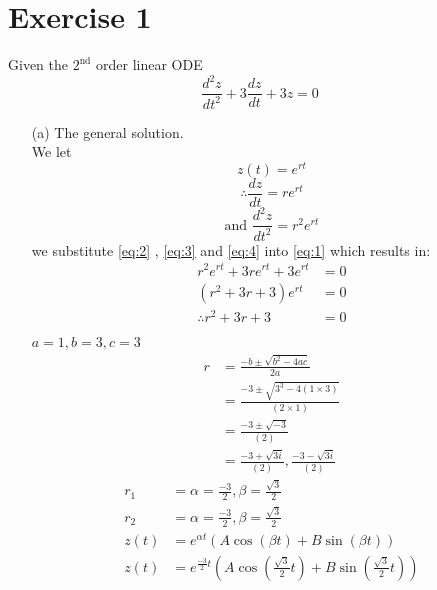 \documentclass[12pt,a4paper]{article}
\begin{document}
\section*{Exercise 1}
Given the $2^{\text{nd}}$ order linear ODE
\begin{equation}
		\frac{d^2z}{dt^2}   + 3 \frac{dz}{dt} + 3z  = 0
		\label{eq:1}
\end{equation}
\begin{enumerate}
			\item[(a)] The general solution.\\
				We let 
					\begin{equation}
							z(t) =  e^{rt} 
							\label{eq:2}
					\end{equation}
					\begin{equation}
							\therefore \frac{dz}{dt}  =  re^{rt} 
							\label{eq:3}
					\end{equation}
					\begin{equation}
						\text{and } 	\frac{d^2z}{dt^2} =  r^2 e^{rt}
						\label{eq:4}
					\end{equation}
				we substitute \eqref{eq:2} ,  \eqref{eq:3} and \eqref{eq:4}  into \eqref{eq:1} which results in:
						\begin{align*}
								r^2e^{rt} + 3re^{rt} + 3e^{rt} &= 0\\
								(r^2 + 3r + 3)e^{rt} &= 0\\
								\therefore r^2 + 3r + 3 &=  0\\
						\end{align*}
						$a  = 1,  b  =  3, c =  3$
						\begin{align*}
								r &=  \frac{  -b \pm \sqrt{ b^2 - 4ac}  }{ 2a}\\
								&= \frac{-3  \pm  \sqrt{3^3 -  4(1\times 3)  } }{(2 \times 1)}\\
								&= \frac{ -3 \pm \sqrt{ -3} }{ (2)}\\
								&=   \frac{ -3 +  \sqrt{ 3i} }{ (2)} ,  \frac{ -3  - \sqrt{ 3i} }{ (2)}
						\end{align*}
						\begin{align*}
								r_1 &=  \alpha = \frac{-3}{2},  \beta =  \frac{\sqrt{3}}{2}\\
								r_2 &=  \alpha = \frac{-3}{2},  \beta =  \frac{\sqrt{3}}{2}\\
							z(t) &= e^{\alpha t}  \left(   A\cos(\beta t)  + B \sin(\beta t)  \right)\\
							z(t) &=  e^{  \frac{-3}{2}  t } \left(  A\cos \left( \frac{\sqrt{3}}{2} t \right)  + B \sin \left( \frac{\sqrt{3}}{2} t\right)   \right)

\end{align*}
\end{enumerate}
\end{document}
